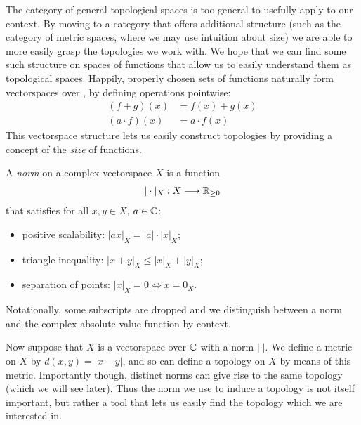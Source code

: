       The category of general topological spaces is too general to usefully apply to our context.
      By moving to a category that offers additional structure (such as the category of metric spaces, where we may use intuition about size) we are able to more easily grasp the topologies we work with.
      We hope that we can find some such structure on spaces of functions that allow us to easily understand them as topological spaces.
      Happily, properly chosen sets of functions naturally form vectorspaces over \C, by defining operations pointwise:
      \begin{align*}
        (f+g)(x) &= f(x)+g(x)\\
        (a\cdot f)(x) &= a\cdot f(x)
      \end{align*}
      This vectorspace structure lets us easily construct topologies by providing a concept of the \emph{size} of functions.
      \begin{defn}
        A \emph{norm} on a complex vectorspace $X$ is a function
        \begin{align*}
          |\cdot|_X:X\longrightarrow\mathbb{R}_{\ge0}
        \end{align*}
        that satisfies for all $x,y\in X$, $a\in\mathbb{C}$:
        \begin{itemize}
          \item positive scalability: $|ax|_X=|a|\cdot|x|_X$;
          \item triangle inequality: $|x+y|_X\le|x|_X+|y|_X$;
          \item separation of points: $|x|_X=0\Longleftrightarrow x=0_X$.
        \end{itemize}
        Notationally, some subscripts are dropped and we distinguish between a norm and the complex absolute-value function by context.
      \end{defn}

      Now suppose that $X$ is a vectorspace over $\mathbb{C}$ with a norm $|\cdot|$.
      We define a metric on $X$ by $d(x,y)=|x-y|$, and so can define a topology on $X$ by means of this metric.
      Importantly though, distinct norms can give rise to the same topology (which we will see later).
      Thus the norm we use to induce a topology is not itself important, but rather a tool that lets us easily find the topology which we are interested in.

